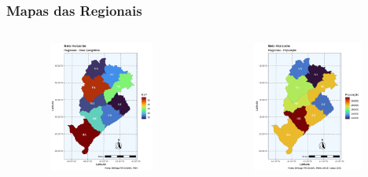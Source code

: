 \begin{frame}

    \frametitle{Mapas das Regionais}
    \begin{columns}[t]
        \begin{column}{7cm}
            \begin{figure}[!htbp]
                \centering
       	    \includegraphics[scale=0.30]{imagens/area.png}
            \end{figure}
        \end{column}
        \begin{column}{7cm}
            \begin{figure}[!htbp]
                \centering
       	    \includegraphics[scale=0.30]{imagens/populacao.png}

\end{figure}
\end{column}
\end{columns}
\end{frame}

